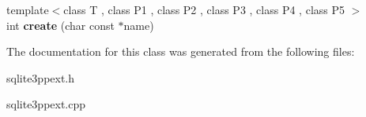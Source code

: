 \begin{DoxyCompactItemize}
\item 
\hypertarget{classsqlite3pp_1_1ext_1_1aggregate_a02677f62769060c39b925f1997c2093d}{{\footnotesize template$<$class T , class P1 , class P2 , class P3 , class P4 , class P5 $>$ }\\int {\bfseries create} (char const $\ast$name)}\label{classsqlite3pp_1_1ext_1_1aggregate_a02677f62769060c39b925f1997c2093d}

\end{DoxyCompactItemize}


The documentation for this class was generated from the following files\-:\begin{DoxyCompactItemize}
\item 
sqlite3ppext.\-h\item 
sqlite3ppext.\-cpp\end{DoxyCompactItemize}
